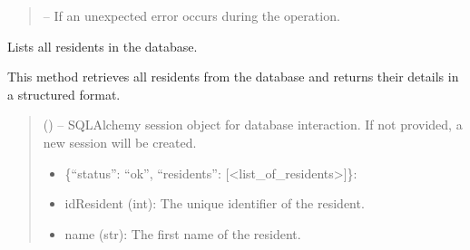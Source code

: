 \documentclass[letterpaper,10pt,english]{sphinxmanual}
\begin{document}
\begin{fulllineitems}
\begin{fulllineitems}
\begin{quote}
\begin{description}
\sphinxAtStartPar
{} – If an unexpected error occurs during the operation.

\end{description}\end{quote}

\end{fulllineitems}


\begin{fulllineitems}
\label{\detokenize{app.controllers:app.controllers.resident_controller.ResidentController.list_residents}}
\pysigstartsignatures
\pysiglinewithargsret
{}
{}
{}
\pysigstopsignatures
\sphinxAtStartPar
Lists all residents in the database.

\sphinxAtStartPar
This method retrieves all residents from the database and returns their details
in a structured format.
\begin{quote}\begin{description}
\sphinxAtStartPar
{} (\sphinxstyleliteralemphasis{\sphinxupquote{, }}) – SQLAlchemy session object for database interaction.
If not provided, a new session will be created.

\sphinxAtStartPar
\begin{description}
\begin{itemize}
\item {} 
\sphinxAtStartPar
\{“status”: “ok”, “residents”: {[}<list\_of\_residents>{]}\}:

\end{itemize}
\begin{description}
\begin{itemize}
\item {} 
\sphinxAtStartPar
idResident (int): The unique identifier of the resident.

\item {} 
\sphinxAtStartPar
name (str): The first name of the resident.


\end{itemize}
\end{description}
\end{description}
\end{description}
\end{quote}
\end{fulllineitems}
\end{fulllineitems}
\end{document}
